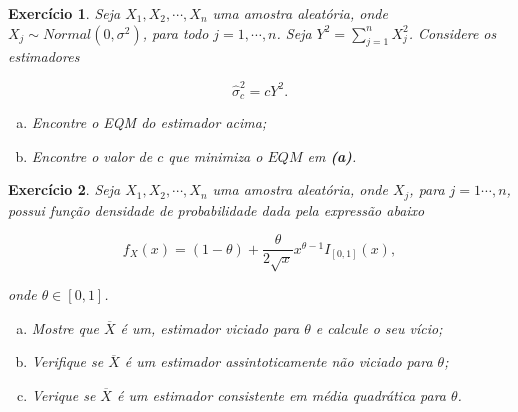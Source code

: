 \documentclass[letter,11pt]{article}
\newtheorem{exer}{Exercício}
\newcommand{\E}{\mathbb{E}}
\begin{document}
\begin{exer} \rm
Seja $X_1,X_2,\cdots,X_n$ uma amostra aleatória, onde $X_j\sim Normal(0,\sigma^2)$, para todo $j=1,\cdots,n$.  Seja $Y^2=\sum_{j=1}^{n}X_j^2$. Considere os estimadores

$$\widehat{\sigma}^2_c=cY^2.$$

\begin{enumerate}[a)]
\item Encontre o EQM do estimador acima;

\item Encontre o valor de $c$ que minimiza o $EQM$ em {\bf(a)}.
\end{enumerate}
\end{exer}


% 
% 
% 

\begin{exer} \rm 
Seja $X_1,X_2,\cdots,X_n$ uma amostra aleatória, onde $X_j$, para $j=1\cdots,n$, possui função densidade de probabilidade dada pela expressão abaixo

$$f_{X}(x)=(1-\theta)+\frac{\theta}{2\sqrt{x }}x^{\theta-1}I_{[0,1]}(x),$$

\noindent onde $\theta\in[0,1]$.

\begin{enumerate}[a)]
\item Mostre que $\overline{X}$ é um, estimador viciado para $\theta$ e calcule o seu vício;

\item Verifique se $\overline{X}$ é um estimador assintoticamente não viciado para $\theta$;

\item Verique se $\overline{X}$ é um estimador consistente em média quadrática para $\theta$.
\end{enumerate}
\end{exer}
\end{document}
